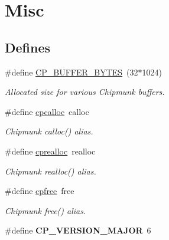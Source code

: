 \hypertarget{group__misc}{\section{Misc}
\label{group__misc}
}
\subsection*{Defines}
\begin{DoxyCompactItemize}
\item 
\hypertarget{group__misc_ga6d034fec4d7962b6f20f9e243527c560}{\#define \hyperlink{group__misc_ga6d034fec4d7962b6f20f9e243527c560}{C\-P\-\_\-\-B\-U\-F\-F\-E\-R\-\_\-\-B\-Y\-T\-E\-S}~(32$\ast$1024)}\label{group__misc_ga6d034fec4d7962b6f20f9e243527c560}

\begin{DoxyCompactList}\small\item\em Allocated size for various Chipmunk buffers. \end{DoxyCompactList}\item 
\hypertarget{group__misc_gac88bab87ecc7db6cc222679bf6082e9b}{\#define \hyperlink{group__misc_gac88bab87ecc7db6cc222679bf6082e9b}{cpcalloc}~calloc}\label{group__misc_gac88bab87ecc7db6cc222679bf6082e9b}

\begin{DoxyCompactList}\small\item\em Chipmunk calloc() alias. \end{DoxyCompactList}\item 
\hypertarget{group__misc_gab3544b888840ed34e49bb0559d6849a8}{\#define \hyperlink{group__misc_gab3544b888840ed34e49bb0559d6849a8}{cprealloc}~realloc}\label{group__misc_gab3544b888840ed34e49bb0559d6849a8}

\begin{DoxyCompactList}\small\item\em Chipmunk realloc() alias. \end{DoxyCompactList}\item 
\hypertarget{group__misc_ga14627263deb67605201281bac734eb04}{\#define \hyperlink{group__misc_ga14627263deb67605201281bac734eb04}{cpfree}~free}\label{group__misc_ga14627263deb67605201281bac734eb04}

\begin{DoxyCompactList}\small\item\em Chipmunk free() alias. \end{DoxyCompactList}\item 
\hypertarget{group__misc_gac02132b57a51a1c26ff6fb11dc046c04}{\#define {\bfseries C\-P\-\_\-\-V\-E\-R\-S\-I\-O\-N\-\_\-\-M\-A\-J\-O\-R}~6}\label{group__misc_gac02132b57a51a1c26ff6fb11dc046c04}


\end{DoxyCompactItemize}
